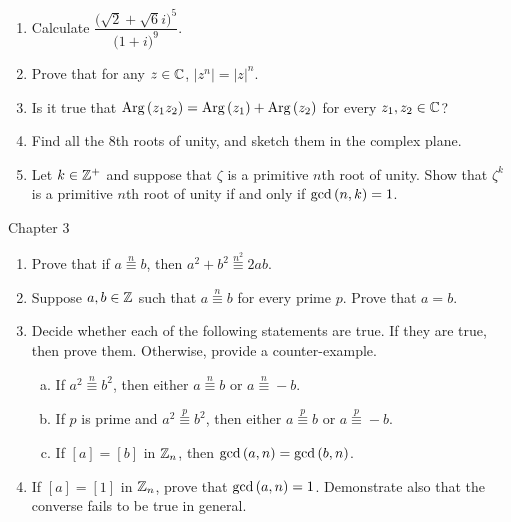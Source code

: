 \documentclass[11pt,fleqn,dvipsnames,usenames]{article}
\begin{document}
\begin{enumerate}
\item Calculate $\dfrac{\big(\sqrt{2} + \sqrt{6}i\big)^5}{\big(1+i\big)^9}$.
\item Prove that for any $z\in\mathbb{C}$, $|z^{n}| = |z|^{n}$.
\item Is it true that $\text{Arg}\left(z_1z_2\right) = \text{Arg}\left(z_1\right) + \text{Arg}\left(z_2\right)$ for every $z_{1},z_{2}\in\mathbb{C}$?
\item Find all the $8$th roots of unity, and sketch them in the complex plane.
\item Let $k\in\mathbb{Z}^{+}$ and suppose that $\zeta$ is a primitive $n$th root of unity.  Show that $\zeta^{k}$ is a primitive $n$th root of unity if and only if $\text{gcd}\left(n,k\right) = 1$.
\end{enumerate}
\vsp

{\huge Chapter 3}
\vsp

\begin{enumerate}
\item Prove that if $a\overset{n}{\equiv}b$, then $a^2 + b^2\overset{n^2}{\equiv}2ab$.
\item Suppose $a,b\in\mathbb{Z}$ such that $a\overset{n}{\equiv}b$ for every prime $p$.  Prove that $a=b$.
\item Decide whether each of the following statements are true.  If they are true, then prove them.  Otherwise, provide a counter-example.
\begin{enumerate}[(a)]
\item If $a^2\overset{n}{\equiv}b^2$, then either $a\overset{n}{\equiv}b$ or $a\overset{n}{\equiv}-b$.
\item If $p$ is prime and $a^2\overset{p}{\equiv}b^2$, then either $a\overset{p}{\equiv}b$ or $a\overset{p}{\equiv}-b$.
\item If $[a] = [b]$ in $\mathbb{Z}_{n}$, then $\text{gcd}\left(a,n\right) = \text{gcd}\left(b,n\right)$.
\end{enumerate}
\item If $[a] = [1]$ in $\mathbb{Z}_{n}$, prove that $\text{gcd}\left(a,n\right) = 1$.  Demonstrate also that the converse fails to be true in general.
\end{enumerate}
\end{document}
